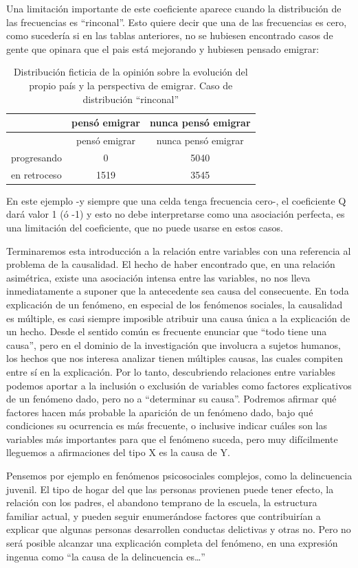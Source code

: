 \documentclass[]{book}
\begin{document}
Una limitación importante de este coeficiente aparece cuando la
distribución de las frecuencias es ``rinconal''. Esto quiere decir que una de las frecuencias es cero, como sucedería si en las tablas anteriores, no se hubiesen encontrado casos de gente que opinara que el pais está mejorando y hubiesen pensado emigrar:

\begin{longtable}[]{@{}lcc@{}}
\caption{\label{tab:unnamed-chunk-140}Distribución ficticia de la opinión sobre la evolución del propio país y la perspectiva de emigrar. Caso de distribución ``rinconal''}\tabularnewline
\toprule
& pensó emigrar & nunca pensó emigrar\tabularnewline
\midrule
\endfirsthead
\toprule
& pensó emigrar & nunca pensó emigrar\tabularnewline
\midrule
\endhead
progresando & 0 & 5040\tabularnewline
en retroceso & 1519 & 3545\tabularnewline
\bottomrule
\end{longtable}

En este ejemplo -y siempre que una celda tenga frecuencia cero-, el
coeficiente Q dará valor 1 (ó -1) y esto no debe interpretarse como una asociación perfecta, es una limitación del coeficiente, que no puede usarse en estos casos.

Terminaremos esta introducción a la relación entre variables con una referencia al problema de la causalidad. El hecho de haber encontrado
que, en una relación asimétrica, existe una asociación intensa entre las variables, no nos lleva inmediatamente a suponer que la antecedente sea causa del consecuente. En toda explicación de un fenómeno, en especial de los fenómenos sociales, la causalidad es múltiple, es casi siempre imposible atribuir una causa única a la explicación de un hecho. Desde el sentido común es frecuente enunciar que ``todo tiene una causa'', pero en el dominio de la investigación que involucra a sujetos humanos, los hechos que nos interesa analizar tienen múltiples causas, las cuales compiten entre sí en la explicación. Por lo tanto, descubriendo relaciones entre variables podemos aportar a la inclusión o exclusión de variables como factores explicativos de un fenómeno dado, pero no a ``determinar su causa''. Podremos afirmar qué factores hacen más probable la aparición de un fenómeno dado, bajo qué condiciones su ocurrencia es más frecuente, o inclusive indicar cuáles son las variables más importantes para que el fenómeno suceda, pero muy difícilmente lleguemos a afirmaciones del tipo X es la causa de Y.

Pensemos por ejemplo en fenómenos psicosociales complejos, como la delincuencia juvenil. El tipo de hogar del que las personas provienen
puede tener efecto, la relación con los padres, el abandono temprano de la escuela, la estructura familiar actual, y pueden seguir enumerándose factores que contribuirían a explicar que algunas personas desarrollen conductas delictivas y otras no. Pero no será posible alcanzar una explicación completa del fenómeno, en una expresión ingenua como ``la causa de la delincuencia es\ldots{}''
\end{document}
